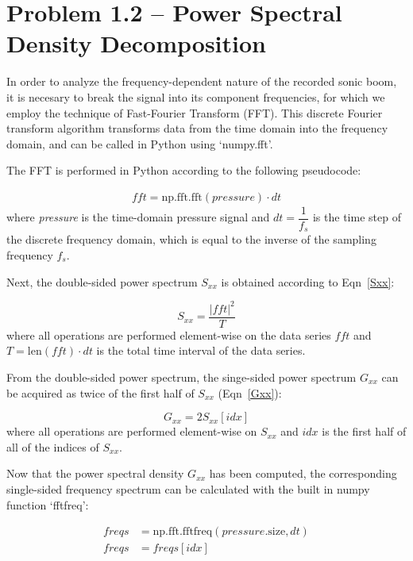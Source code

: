 \documentclass[twocolumn,10pt]{asme2ej}
\begin{document}
\section{Problem 1.2 -- Power Spectral Density Decomposition}

In order to analyze the frequency-dependent nature of the recorded sonic boom, it is necesary to break the signal into its component frequencies, for which we employ the technique of Fast-Fourier Transform (FFT).  This discrete Fourier transform algorithm transforms data from the time domain into the frequency domain, and can be called in Python using `numpy.fft'.

The FFT is performed in Python according to the following pseudocode:

\begin{gather*}
fft = \text{np.fft.fft}(pressure)\cdot dt
\end{gather*}
\noindent where \emph{pressure} is the time-domain pressure signal and $dt=\dfrac{1}{f_s}$ is the time step of the discrete frequency domain, which is equal to the inverse of the sampling frequency $f_s$.

\noindent Next, the double-sided power spectrum $S_{xx}$ is obtained according to Eqn~\ref{Sxx}:

\begin{equation} \label{Sxx}
S_{xx} = \frac{|fft|^2}{T}
\end{equation}
\noindent where all operations are performed element-wise on the data series $fft$ and $T=\text{len}(fft)\cdot dt$ is the total time interval of the data series.

From the double-sided power spectrum, the singe-sided power spectrum $G_{xx}$ can be acquired as twice of the first half of $S_{xx}$ (Eqn~\ref{Gxx}):

\begin{equation} \label{Gxx}
G_{xx} = 2S_{xx}[idx]
\end{equation}
\noindent where all operations are performed element-wise on $S_{xx}$ and $idx$ is the first half of all of the indices of $S_{xx}$.

Now that the power spectral density $G_{xx}$ has been computed, the corresponding single-sided frequency spectrum can be calculated with the built in numpy function `fftfreq':

\begin{align*}
freqs &= \text{np.fft.fftfreq}(pressure{}\text{.size}, dt) \\
freqs &= freqs[idx]
\end{align*}
\end{document}
